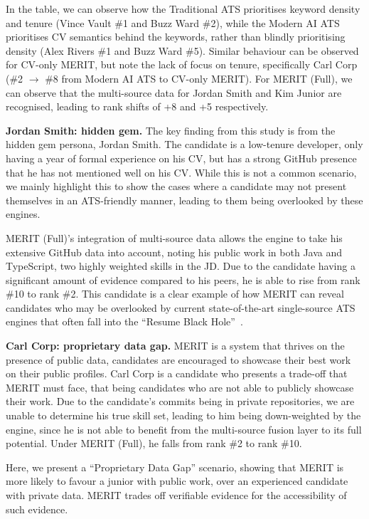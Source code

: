In the table, we can observe how the Traditional ATS prioritises keyword density and tenure (Vince Vault \#1 and Buzz Ward \#2),
while the Modern AI ATS prioritises CV semantics behind the keywords, rather than blindly prioritising density (Alex Rivers \#1 and Buzz Ward \#5).
Similar behaviour can be observed for CV-only MERIT, but note the lack of focus on tenure, specifically Carl Corp (\#2 $\rightarrow$ \#8 from Modern AI ATS to CV-only MERIT).
For MERIT (Full), we can observe that the multi-source data for Jordan Smith and Kim Junior are recognised, leading to rank shifts of +8 and +5 respectively.

\textbf{Jordan Smith: hidden gem.} The key finding from this study is from the hidden gem persona, Jordan Smith. The candidate is a low-tenure developer, only having
a year of formal experience on his CV, but has a strong GitHub presence that he has not mentioned well on his CV. While this is not a common scenario,
we mainly highlight this to show the cases where a candidate may not present themselves in an ATS-friendly manner, leading to them being overlooked by these engines.

MERIT (Full)'s integration of multi-source data allows the engine to take his extensive GitHub data into account, noting his public work in both Java and TypeScript,
two highly weighted skills in the JD. Due to the candidate having a significant amount of evidence compared to his peers, he is able to rise from rank \#10 to rank \#2.
This candidate is a clear example of how MERIT can reveal candidates who may be overlooked by current state-of-the-art single-source ATS engines that often
fall into the ``Resume Black Hole''~\cite{fuller2021hiddenworkers}.

\textbf{Carl Corp: proprietary data gap.} MERIT is a system that thrives on the presence of public data, candidates are encouraged to showcase their best work on their public profiles.
Carl Corp is a candidate who presents a trade-off that MERIT must face, that being candidates who are not able to publicly showcase their work.
Due to the candidate's commits being in private repositories, we are unable to determine his true skill set, leading to him being down-weighted by the engine,
since he is not able to benefit from the multi-source fusion layer to its full potential. Under MERIT (Full), he falls from rank \#2 to rank \#10.

Here, we present a ``Proprietary Data Gap'' scenario, showing that MERIT is more likely to favour a junior with public work, over an experienced candidate
with private data. MERIT trades off verifiable evidence for the accessibility of such evidence.

